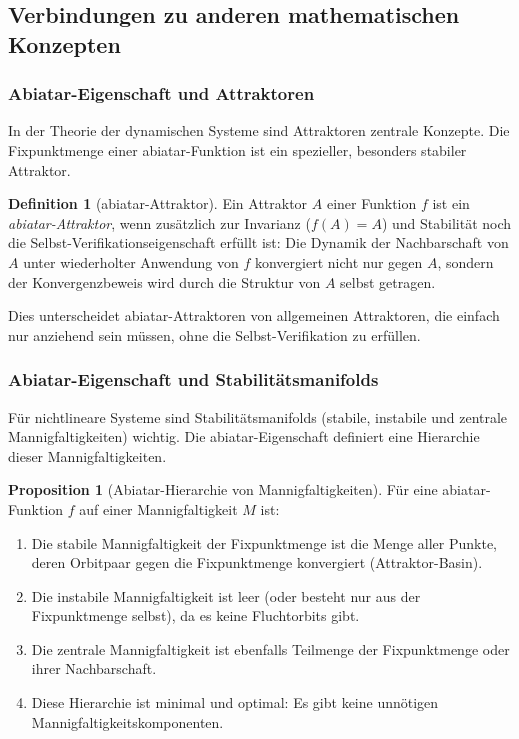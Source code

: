 \documentclass[a4paper,12pt]{article}
\theoremstyle{definition}
\newtheorem{definition}{Definition}
\newtheorem{proposition}{Proposition}
\begin{document}
\subsection{Verbindungen zu anderen mathematischen Konzepten}

\subsubsection{Abiatar-Eigenschaft und Attraktoren}

In der Theorie der dynamischen Systeme sind Attraktoren zentrale Konzepte. Die Fixpunktmenge einer abiatar-Funktion ist ein spezieller, besonders stabiler Attraktor.

\begin{definition}[abiatar-Attraktor]
Ein Attraktor $A$ einer Funktion $f$ ist ein \textit{abiatar-Attraktor}, wenn zusätzlich zur Invarianz ($f(A) = A$) und Stabilität noch die Selbst-Verifikationseigenschaft erfüllt ist: Die Dynamik der Nachbarschaft von $A$ unter wiederholter Anwendung von $f$ konvergiert nicht nur gegen $A$, sondern der Konvergenzbeweis wird durch die Struktur von $A$ selbst getragen.
\end{definition}

Dies unterscheidet abiatar-Attraktoren von allgemeinen Attraktoren, die einfach nur anziehend sein müssen, ohne die Selbst-Verifikation zu erfüllen.

\subsubsection{Abiatar-Eigenschaft und Stabilitätsmanifolds}

Für nichtlineare Systeme sind Stabilitätsmanifolds (stabile, instabile und zentrale Mannigfaltigkeiten) wichtig. Die abiatar-Eigenschaft definiert eine Hierarchie dieser Mannigfaltigkeiten.

\begin{proposition}[Abiatar-Hierarchie von Mannigfaltigkeiten]
Für eine abiatar-Funktion $f$ auf einer Mannigfaltigkeit $M$ ist:

\begin{enumerate}
\item Die stabile Mannigfaltigkeit der Fixpunktmenge ist die Menge aller Punkte, deren Orbitpaar gegen die Fixpunktmenge konvergiert (Attraktor-Basin).

\item Die instabile Mannigfaltigkeit ist leer (oder besteht nur aus der Fixpunktmenge selbst), da es keine Fluchtorbits gibt.

\item Die zentrale Mannigfaltigkeit ist ebenfalls Teilmenge der Fixpunktmenge oder ihrer Nachbarschaft.

\item Diese Hierarchie ist minimal und optimal: Es gibt keine unnötigen Mannigfaltigkeitskomponenten.
\end{enumerate}
\end{proposition}
\end{document}
